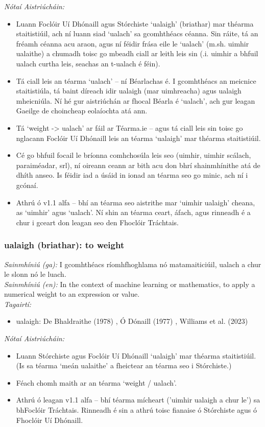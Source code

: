  \noindent \textit{Nótaí Aistriúcháin:}
\begin{itemize}
	\item Luann Foclóir Uí Dhónaill agus Stórchiste `ualaigh' (briathar) mar théarma staitistiúil, ach ní luann siad `ualach' sa gcomhthéacs céanna. Sin ráite, tá an fréamh céanna acu araon, agus ní féidir frása eile le `ualach' (m.sh. uimhir ualaithe) a chumadh toisc go mbeadh ciall ar leith leis sin (.i. uimhir a bhfuil ualach curtha leis, seachas an t-ualach é féin).
	\item Tá ciall leis an téarma `ualach' -- ní Béarlachas é. I gcomhthéacs an meicnice staitistiúla, tá baint díreach idir ualaigh (mar uimhreacha) agus ualaigh mheicniúla. Ní hé gur aistriúchán ar fhocal Béarla é `ualach', ach gur leagan Gaeilge de choincheap eolaíochta atá ann.
	\item Tá `weight -> ualach' ar fáil ar Téarma.ie -- agus tá ciall leis sin toisc go nglacann Foclóir Uí Dhónaill leis an téarma `ualaigh' mar théarma staitistiúil. 
	\item Cé go bhfuil focail le bríonna comhchosúla leis seo (uimhir, uimhir scálach, paraiméadar, srl), ní oireann ceann ar bith acu don bhrí shainmhínithe atá de dhíth anseo. Is féidir iad a úsáid in ionad an téarma seo go minic, ach ní i gcónaí.
	\item Athrú ó v1.1 alfa -- bhí an téarma seo aistrithe mar `uimhir ualaigh' cheana, as `uimhir' agus `ualach'. Ní shin an téarma ceart, áfach, agus rinneadh é a chur i gceart don leagan seo den Fhoclóir Tráchtais.
\end{itemize}


\subsubsection*{ualaigh (briathar): to weight}
 \noindent \textit{Sainmhíniú (ga):} I gcomhthéacs ríomhfhoghlama nó matamaiticiúil, ualach a chur le slonn nó le luach.
\\
 \noindent \textit{Sainmhíniú (en):} In the context of machine learning or mathematics, to apply a numerical weight to an expression or value.
\\
 \noindent \textit{Tagairtí:}
\begin{itemize}
	\item ualaigh: De Bhaldraithe (1978) \cite{de-bhaldraithe}, Ó Dónaill (1977) \cite{odonaill}, Williams et al. (2023) \cite{storchiste}
\end{itemize}

 \noindent \textit{Nótaí Aistriúcháin:}
\begin{itemize}
	\item Luann Stórchiste agus Foclóir Uí Dhónaill `ualaigh' mar théarma staitistiúil. (Is sa téarma `meán ualaithe' a fheictear an téarma seo i Stórchiste.)
	\item Féach chomh maith ar an téarma `weight / ualach'.
	\item Athrú ó leagan v1.1 alfa -- bhí téarma mícheart ('uimhir ualaigh a chur le') sa bhFoclóir Tráchtais. Rinneadh é sin a athrú toisc fianaise ó Stórchiste agus ó Fhoclóir Uí Dhónaill.
\end{itemize}



